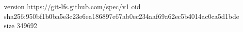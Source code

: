 version https://git-lfs.github.com/spec/v1
oid sha256:950bf1b0ba5e3c23e6ea186897e67ab0ec234aaf69a62ec5b4014ac0ca5d1bde
size 349692
